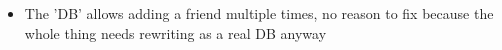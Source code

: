 \begin{itemize}
\item The 'DB' allows adding a friend multiple times, no reason to fix because the
      whole thing needs rewriting as a real DB anyway
\end{itemize}
